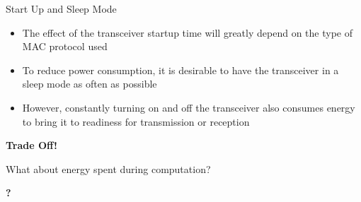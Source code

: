 \documentclass[aspectratio=169,11pt]{beamer}
\begin{document}
\begin{frame}{Start Up and Sleep Mode}
    \begin{itemize}
        \item The effect of the transceiver startup time will greatly depend on the type of MAC protocol used
        \item To reduce power consumption, it is desirable to have the transceiver in a sleep mode as often as possible
        \item However, constantly turning on and off the transceiver also consumes energy to bring it to readiness for transmission or reception
    \end{itemize}
    
    \vspace{0.5cm}
    \begin{center}
        \Large\textbf{Trade Off!}
    \end{center}
\end{frame}

\begin{frame}{What about energy spent during computation?}
    \begin{center}
        \Large\textbf{?}
    \end{center}
\end{frame}
\end{document}
